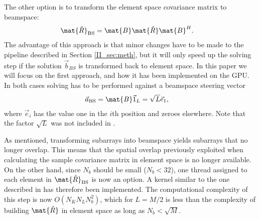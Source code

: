 The other option is to transform the element space covariance matrix to beamspace:
%
\begin{align}
\mat{\hat{R}}_\text{BS} &= \mat{B}\mat{\hat{R}}\mat{B}^H.
\end{align}
%
The advantage of this approach is that minor changes have to be made to the pipeline described in Section \ref{II_sec:meth}, but it will only speed up the solving step if the solution $\vec{b}_{BS}$ is transformed back to element space. In this paper we will focus on the first approach, and how it has been implemented on the GPU.
In both cases solving has to be performed against a beamspace steering vector
\begin{align}
\vec{a}_\text{BS} &= \mat{B}\vec{1}_L = \sqrt{L}\vec{e}_1,
\end{align}
where $\vec{e}_i$ has the value one in the $i$th position and zeroes elsewhere. Note that the factor $\sqrt{L}$ was not included in \cite{Nilsen2009}.

As mentioned, transforming subarrays into beamspace yields subarrays that no longer overlap. This means that the spatial overlap previously exploited when calculating the sample covariance matrix in element space is no longer available. On the other hand, since $N_b$ should be small ($N_b < 32$), one thread assigned to each element in $\mat{\hat{R}}_\text{BS}$ is now an option. A kernel similar to the one described in \cite{Chen2011} has therefore been implemented. The computational complexity of this step is now $O(N_KN_LN_b^2)$, which for $L=M/2$ is less than the complexity of building $\mat{\hat{R}}$ in element space as long as $N_b < \sqrt{M}$.

